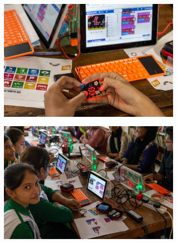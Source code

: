 \documentclass[12pt]{report} %
\begin{document}
\begin{figure}[t!]
        \begin{subfigure}[]{0.46\textwidth}
        \centering
        \includegraphics[width=1.0\textwidth]{dyb_coxsbazar_s_23}
    \end{subfigure}
    \begin{subfigure}[]{0.46\textwidth}
        \centering
        \includegraphics[width=1.0\textwidth]{dyb_coxsbazar_s_25}
    \end{subfigure}


\end{figure}
\end{document}

